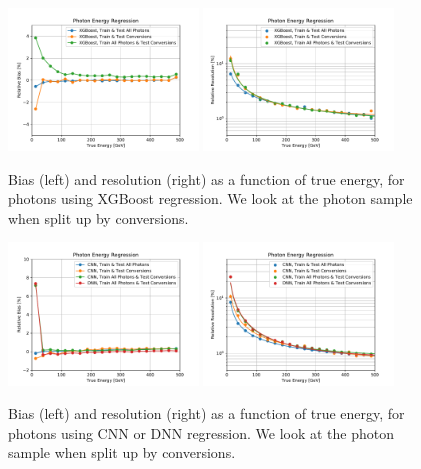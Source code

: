 \begin{figure}[htbp]
\centering
\includegraphics[width=0.45\textwidth]{Images/Calo/bias_vs_E_GammaFixed_xgb_convs.pdf}
\includegraphics[width=0.45\textwidth]{Images/Calo/res_vs_E_GammaFixed_xgb_convs_fits.pdf}
\caption{Bias (left) and resolution (right) as a function of true energy, for photons using XGBoost regression.  We look at the photon sample when split up by conversions.
}
\label{fig:reg_xgb_conv_gamma}
\end{figure}

\begin{figure}[htbp]
\centering
\includegraphics[width=0.45\textwidth]{Images/Calo/bias_vs_E_GammaFixed_nn_convs.pdf}
\includegraphics[width=0.45\textwidth]{Images/Calo/res_vs_E_GammaFixed_nn_convs_fits.pdf}
\caption{Bias (left) and resolution (right) as a function of true energy, for photons using CNN or DNN regression.  We look at the photon sample when split up by conversions.
}
\label{fig:reg_nn_conv_gamma}
\end{figure}

